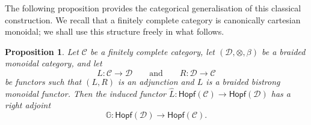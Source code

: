 \documentclass{amsart}
\newtheorem{proposition}{Proposition}[section]
\begin{document}
The following proposition provides the categorical generalisation of this classical construction. We recall that a finitely complete category is canonically cartesian monoidal; we shall use this structure freely in what follows.

\begin{proposition}\label{prop:grouplike_adjunction}
Let $\mathcal{C}$ be a finitely complete category, let $(\mathcal{D}, \otimes, \beta)$ be a braided monoidal category, and let
\[
L \colon \mathcal{C} \longrightarrow \mathcal{D}
\qquad\text{and}\qquad
R \colon \mathcal{D} \longrightarrow \mathcal{C}
\]
be functors such that $(L, R)$ is an adjunction and $L$ is a braided bistrong monoidal functor. Then the induced functor $\widehat{L} \colon \mathsf{Hopf}(\mathcal{C}) \longrightarrow \mathsf{Hopf}(\mathcal{D})$ has a right adjoint
\[
\mathbb{G} \colon \mathsf{Hopf}(\mathcal{D}) \longrightarrow \mathsf{Hopf}(\mathcal{C}).
\]
\end{proposition}
\end{document}
